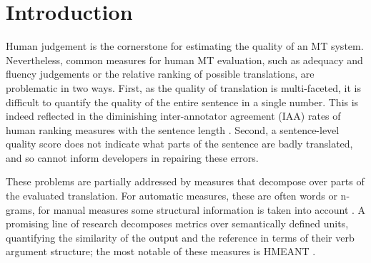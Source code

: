 \documentclass[11pt,letterpaper]{article}
\def\parcite#1{\cite{#1}}
\begin{document}
\begin{abstract}

\end{abstract}


\section{Introduction}\label{sec:intro}

Human judgement is the cornerstone for estimating the quality of an MT system.
Nevertheless, common measures for human MT evaluation, such as adequacy and fluency judgements
or the relative ranking of possible translations, are problematic in two ways.
First, as the quality of translation is multi-faceted, it is difficult
to quantify the quality of the entire sentence in a single number. This
is indeed reflected in the diminishing inter-annotator agreement (IAA) rates of human ranking measures
with the sentence length \cite{Bojar:2011}.
Second, a sentence-level quality score does not indicate what parts of the sentence
are badly translated, and so cannot inform developers in repairing these errors.

These problems are partially addressed by measures that decompose over parts of the evaluated
translation. For automatic measures,
these are often words or n-grams, for manual measures some structural
information is taken into account \parcite{machacek:bojar:segranks:2015}.
A promising line of research decomposes metrics
over semantically defined units,
quantifying the similarity of the output and the reference in terms of
their verb argument structure; the most notable of these measures is HMEANT
\parcite{lo2011structured}.
\end{document}
